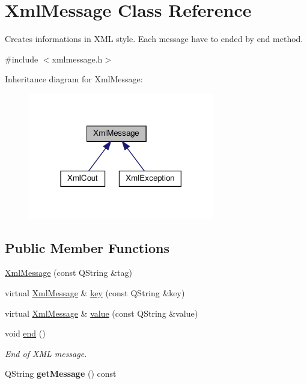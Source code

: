 \hypertarget{classXmlMessage}{}\section{Xml\+Message Class Reference}
\label{classXmlMessage}


Creates informations in X\+ML style. Each message have to ended by end method.  




{\ttfamily \#include $<$xmlmessage.\+h$>$}



Inheritance diagram for Xml\+Message\+:\nopagebreak
\begin{figure}[H]
\begin{center}
\leavevmode
\includegraphics[width=230pt]{d3/d38/classXmlMessage__inherit__graph}
\end{center}
\end{figure}
\subsection*{Public Member Functions}
\begin{DoxyCompactItemize}
\item 
\hyperlink{classXmlMessage_a81b72c91fddb884f5aaf88ca26390a75}{Xml\+Message} (const Q\+String \&tag)
\item 
virtual \hyperlink{classXmlMessage}{Xml\+Message} \& \hyperlink{classXmlMessage_a01b2e1d62348aad36158687344d50518}{key} (const Q\+String \&key)
\item 
virtual \hyperlink{classXmlMessage}{Xml\+Message} \& \hyperlink{classXmlMessage_aef54b1b878c75f170139d1885597cb63}{value} (const Q\+String \&value)
\item 
\mbox{\label{classXmlMessage_a82139f46cdc5fd8bf1a742c8a8ea75ab}} 
void \hyperlink{classXmlMessage_a82139f46cdc5fd8bf1a742c8a8ea75ab}{end} ()
\begin{DoxyCompactList}\small\item\em End of X\+ML message. \end{DoxyCompactList}\item 
\mbox{\label{classXmlMessage_ad0eae7ac58a786b0eb55b2204fb237ae}} 
Q\+String {\bfseries get\+Message} () const
\end{DoxyCompactItemize}


